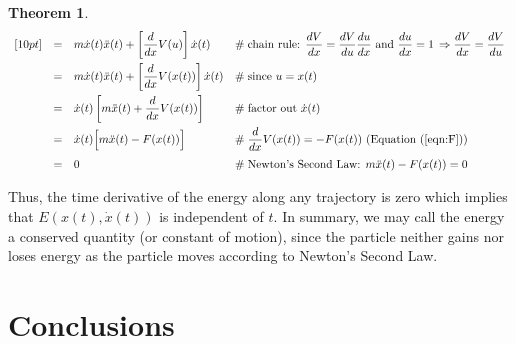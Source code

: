 \documentclass{article}
\theoremstyle{definition}
\newtheorem{theorem}{Theorem}[section]
\begin{document}
\begin{theorem}
\begin{equation*}
\begin{array}{llll}
[10pt]
&=& m\dot{x}(t)\ddot{x}(t) + \left [ \dfrac{d}{dx}V(u) \right ] \dot{x}(t)
		&\hspace{0em} \mathrel{\#} \text{chain rule: $\dfrac{dV}{dx} = 
									     \dfrac{dV}{du} \dfrac{du}{dx}$ 
										 and 
										 $\dfrac{du}{dx} = 1
										 \, \Rightarrow
										 \dfrac{dV}{dx} = \dfrac{dV}{du}$}\\
[10pt]
&=& m\dot{x}(t)\ddot{x}(t) + \left [ \dfrac{d}{dx}V(x(t)) \right ] \dot{x}(t)
		&\hspace{0em} \mathrel{\#} \text{since $u = x(t)$} \\
[10pt]
&=& \dot{x}(t)\left [m \ddot{x}(t) + \dfrac{d}{dx}V(x(t)) \right ]
		&\hspace{0em} \mathrel{\#} \text{factor out $\dot{x}(t)$} \\
[10pt]
&=& \dot{x}(t)\Big [m \ddot{x}(t) - F(x(t)) \Big ]
		&\hspace{0em} \mathrel{\#} \text{$\dfrac{d}{dx}V(x(t)) = - F(x(t))$ 
		                                 (Equation (\ref{eqn:F}))} \\
[10pt]
&=& 0
		&\hspace{0em} \mathrel{\#} \text{Newton's Second Law: $m \ddot{x}(t) - F(x(t)) = 0$} 
\end{array}
\end{equation*}

\medskip
\noindent
Thus, the time derivative of the energy along any trajectory is zero which implies that
$E(x(t), \dot{x}(t))$ is independent of $t$. In summary, we may call the energy a conserved 
quantity (or constant of motion), since the particle neither gains nor loses energy as the 
particle moves according to Newton’s Second Law.
\end{theorem}
%
%
% 
%
%
%
%
%
%
%
%
%
\section{Conclusions}
%
%
%
\end{document}
